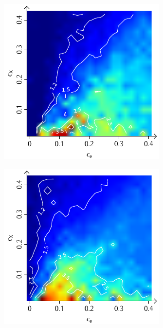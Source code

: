 \documentclass[a4paper, 10pt, twoside, openany]{book} %
\begin{document}
\begin{figure}
    \begin{minipage}[t]{0.48\textwidth}
        \includegraphics[width=\textwidth]{Abbildungen/Phasendiagramme/Konturen/F_cluster_D.pdf}
        \label{F_cluster_D}
    \end{minipage}
    \hfill
    \begin{minipage}[t]{0.48\textwidth}
        \includegraphics[width=\textwidth]{Abbildungen/Phasendiagramme/Konturen/F_penalty_cluster_D.pdf}

\end{minipage}
\end{figure}
\end{document}
